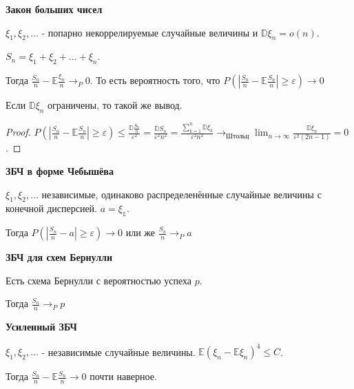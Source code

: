 \begin{theorem}
    \textbf{Закон больших чисел}

    $\xi_1, \xi_2, \ldots$ - попарно некоррелируемые случайные величины и 
    $\mathbb{D}\xi_n = o(n)$.

    $S_n = \xi_1 + \xi_2 + \ldots + \xi_n$. 
    
    Тогда $\frac{S_n}{n} - \mathbb{E}\frac{\xi_n}{n} \rightarrow_P 0$.
    То есть вероятность того, что $P(|\frac{S_n}{n} - \mathbb{E}\frac{S_n}{n}| \geqslant \varepsilon) \rightarrow 0$
\end{theorem}

\begin{consequence}
    Если $\mathbb{D}\xi_n$ ограничены, то такой же вывод.
\end{consequence}

\begin{proof}
    $P(\left |\frac{S_n}{n} - \mathbb{E}\frac{S_n}{n} \right | \geqslant \varepsilon) \leqslant \frac{\mathbb{D}\frac{S_n}{n}}{\varepsilon^2} = \frac{\mathbb{D}S_n}{\varepsilon^2n^2} = 
    \frac{\sum_{k = 1}^n \mathbb{D}\xi_k}{\varepsilon^2n^2} \rightarrow_{\text{Штольц}} \lim_{n \to \infty} \frac{\mathbb{D}\xi_n}{\varepsilon^2(2n - 1)} = 0$.
\end{proof}

\begin{consequence}
    \textbf{ЗБЧ в форме Чебышёва}

    $\xi_1, \xi_2, \ldots$ независимые, одинаково распределенённые случайные величины с конечной дисперсией.
    $a = \mathbb{\xi_1}$.
    
    Тогда $P(\left | \frac{S_n}{n} - a \right | \geqslant \varepsilon) \rightarrow 0$ или же $\frac{S_n}{n} \rightarrow_P a$
\end{consequence}

\begin{consequence}
    \textbf{ЗБЧ для схем Бернулли}

    Есть схема Бернулли с вероятностью успеха $p$.

    Тогда $\frac{S_n}{n} \rightarrow_P p$
\end{consequence}

\begin{theorem}
    \textbf{Усиленный ЗБЧ}

    $\xi_1, \xi_2, \ldots$ - независимые случайные величины. 
    $\mathbb{E} (\xi_n - \mathbb{E}\xi_n)^4 \leqslant C$.

    Тогда $\frac{S_n}{n} - \mathbb{E} \frac{S_n}{n} \rightarrow 0$ почти наверное.
\end{theorem}

